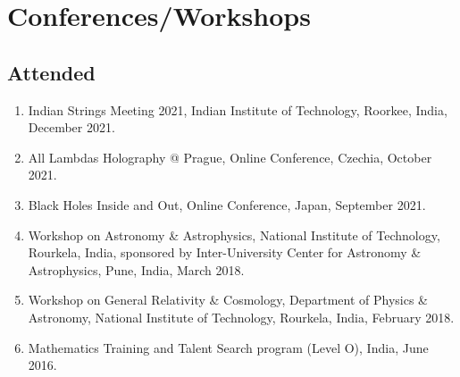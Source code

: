 \documentclass[11pt, letterpaper]{article}
\begin{document}
	\section{Conferences/Workshops}
	\subsection{Attended}
	\begin{enumerate}
		\item Indian Strings Meeting 2021, Indian Institute of Technology, Roorkee, India, December 2021.

		\item All Lambdas Holography @ Prague, Online Conference, Czechia, October 2021.

		\item Black Holes Inside and Out, Online Conference, Japan, September 2021.
		
		\item Workshop on Astronomy \& Astrophysics, National Institute of Technology, Rourkela, India, sponsored by Inter-University Center for Astronomy \& Astrophysics, Pune, India, March 2018.

		\item Workshop on General Relativity \& Cosmology, Department of Physics \& Astronomy, National Institute of Technology, Rourkela, India, February 2018.
		
		\item Mathematics Training and Talent Search program (Level O), India, June 2016.
	\end{enumerate}	
	
\end{document}
